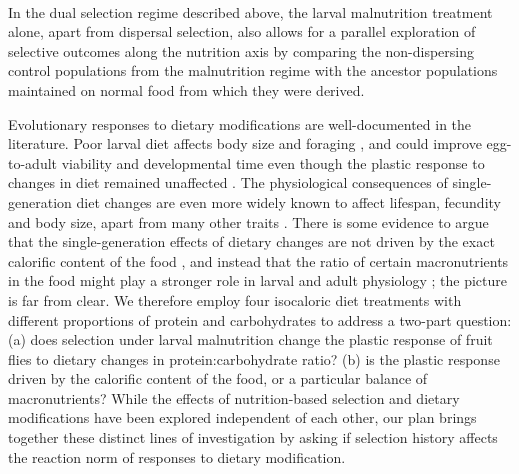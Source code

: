 \documentclass[12pt,onecolumn,twoside]{article}
\begin{document}

	\paragraph{\empty} In the dual selection regime described above, the larval malnutrition treatment alone, apart from dispersal selection, also allows for a parallel exploration of selective outcomes along the nutrition axis by comparing the non-dispersing control populations from the malnutrition regime with the ancestor populations maintained on normal food from which they were derived.

	Evolutionary responses to dietary modifications are well-documented in the literature. Poor larval diet affects body size and foraging \citep{Ahmad2018, Vijendravarma2012}, and could improve egg-to-adult viability and developmental time even though the plastic response to changes in diet remained unaffected \citep{Kolss2009}. The physiological consequences of single-generation diet changes are even more widely known to affect lifespan, fecundity and body size, apart from many other traits \citep{Lee2008, Tatar2014, Musselman2011, Skorupa2008}. There is some evidence to argue that the single-generation effects of dietary changes are not driven by the exact calorific content of the food \citep{Mair2005}, and instead that the ratio of certain macronutrients in the food might play a stronger role in larval and adult physiology \citep{Tatar2014, Lihoreau2016}; the picture is far from clear. We therefore employ four isocaloric diet treatments with different proportions of protein and carbohydrates to address a two-part question: (a) does selection under larval malnutrition change the plastic response of fruit flies to dietary changes in protein:carbohydrate ratio? (b) is the plastic response driven by the calorific content of the food, or a particular balance of macronutrients? While the effects of nutrition-based selection and dietary modifications have been explored independent of each other, our plan brings together these distinct lines of investigation by asking if selection history affects the reaction norm of responses to dietary modification.
\end{document}
